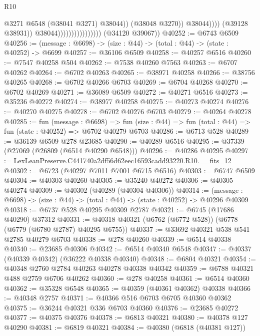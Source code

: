 \begin{lexlean}{R10}
\begin{coremodule}
                                                      @3271
                                                      @6548
                                                      (@38041 @3271)
                                                      @38044))
                                                  (@38048 @3270))
                                                @38044))))
                                        (@39128 @38931))
                                      @38044))))))))))))))))
      (@34120 @39067))
@40252 := @6743 @6509
@40256 := (message : @6698) -> (size : @44) -> (total : @44) -> (state : @40252) -> @6699
@40257 := @36106 @6509
@40258 := @40257 @6516
@40260 := @7547 @40258 @504
@40262 := @7538 @40260 @7563
@40263 := @6707 @40262
@40264 := @6702 @40263
@40265 := @38971 @40258
@40266 := @38756 @40265
@40268 := @6702 @40266 @6703
@40269 := @6704 @40268
@40270 := @6702 @40269
@40271 := @36089 @6509
@40272 := @40271 @6516
@40273 := @35236 @40272
@40274 := @38977 @40258
@40275 := @40273 @40274
@40276 := @40270 @40275
@40278 := @6702 @40276 @6703
@40279 := @40264 @40278
@40285 := fun (message : @6698) =>
  fun (size : @44) => fun (total : @44) => fun (state : @40252) => @6702 @40279 @6703
@40286 := @6713 @528
@40289 := @36139 @6509 @278 @23685
@40290 := @40289 @6516
@40295 := @37339 (@27069 (@26809 (@6514 @40290 @6548)))
@40296 := @40286 @40295
@40297 := LexLeanPreserve.C441740a2df56d62eec16593cadd93220.R10.__fits_12
@40302 := @6723 (@40297 @7011 @7001 @6715 @6516)
@40303 := @6747 @6509
@40304 := @40303 @40260
@40305 := @35240 @40272
@40306 := @40305 @40274
@40309 := @40302 (@40289 (@40304 @40306))
@40314 := (message : @6698) -> (size : @44) -> (total : @44) -> (state : @40252) -> @40296 @40309
@40318 := @6737 @528 @40295 @40309 @2787
@40321 := @6745 (@17686 @40290) @37312
@40331 := @40318 @40321 (@6762 (@6772 @528)) (@6778 (@6779 (@6780 @2787) @40295 @6755))
@40337 := @33692 @40321 @538 @541 @2785 @40279 @6703
@40338 := @278 @40260
@40339 := @6514 @40338
@40340 := @23685 @40306
@40342 := @6514 @40340 @6548
@40347 := @40337 (@40339 @40342) (@36222 @40338 @40340)
@40348 := @6804 @40321
@40354 := @40348 @2760 @2784 @40263 @40278 @40338 @40342
@40359 := @6788 @40321 @488 @2759 @6706 @40262
@40360 := @278 @40258
@40361 := @6514 @40360
@40362 := @35328 @6548
@40365 := @40359 (@40361 @40362) @40338
@40366 := @40348 @2757
@40371 := @40366 @516 @6703 @6705 @40360 @40362
@40375 := @36244 @40321 @336 @6703 @40360
@40376 := @23685 @40272
@40377 := @40375 @40376
@40378 := @6813 @40321
@40380 := @40378 @127 @40290
@40381 := @6819 @40321
@40384 := @40380 (@6818 (@40381 @127))

\end{coremodule}
\end{lexlean}
